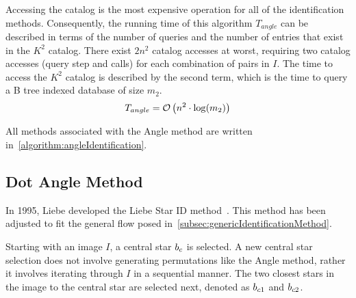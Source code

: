 Accessing the catalog is the most expensive operation for all of the identification methods.
Consequently, the running time of this algorithm $T_{angle}$ can be described in terms of the number of queries and
the number of entries that exist in the $K^2$ catalog.
There exist $2n^2$ catalog accesses at worst, requiring two catalog accesses (query step and  calls) for
each combination of pairs in $I$.
The time to access the $K^2$ catalog is described by the second term, which is the time to query a B tree
indexed database of size $m_2$.
\begin{equation}\label{eq:complexityAngle}
    T_{angle} = \bigO\left( n^2 \cdot \log(m_2) \right)
\end{equation}

All methods associated with the Angle method are written in~\autoref{algorithm:angleIdentification}.

\subsection{Dot Angle Method}\label{subsec:dotAngleMethod}
In 1995, Liebe developed the Liebe Star ID method~\cite{DotAngle,AnalysisUncompensated}.
This method has been adjusted to fit the general flow posed in~\autoref{subsec:genericIdentificationMethod}.

Starting with an image $I$, a central star $b_c$ is selected.
A new central star selection does not involve generating permutations like the Angle method, rather it involves
iterating through $I$ in a sequential manner.
The two closest stars in the image to the central star are selected next, denoted as $b_{c1}$ and $b_{c2}$.

